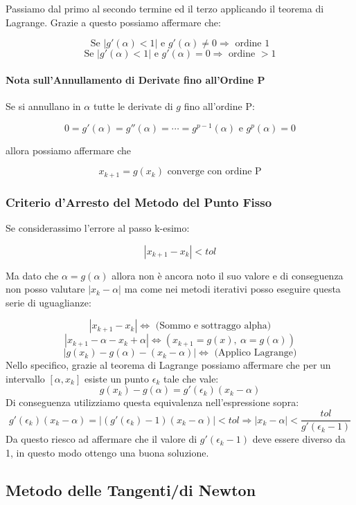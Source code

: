 \documentclass{article}
\begin{document}
Passiamo dal primo al secondo termine ed il terzo applicando il teorema di Lagrange. Grazie a questo possiamo affermare che:

\[ \text{Se } |g'(\alpha) < 1| \text{ e } g'(\alpha) \neq 0 \Rightarrow \text{ ordine 1} \]
\[ \text{Se } |g'(\alpha) < 1| \text{ e } g'(\alpha) = 0 \Rightarrow \text{ ordine } > 1 \]

\paragraph{Nota sull'Annullamento di Derivate fino all'Ordine P} Se si annullano in $\alpha$ tutte le derivate di $g$ fino all'ordine P:

\[ 0 = g'(\alpha) = g''(\alpha) = \cdots = g^{p-1}(\alpha) \text{ e } g^{p}(\alpha) = 0 \]

allora possiamo affermare che

\[ x_{k+1} = g(x_{k}) \text{ converge con ordine P} \]

\subsubsection{Criterio d'Arresto del Metodo del Punto Fisso}

Se considerassimo l'errore al passo k-esimo:

\[ |x_{k+1} - x_{k}| < tol \]

Ma dato che $\alpha = g(\alpha)$ allora non è ancora noto il suo valore e di conseguenza non posso valutare $|x_{k} - \alpha|$ ma come nei metodi iterativi
posso eseguire questa serie di uguaglianze:

\[ |x_{k+1} - x_{k}| \Leftrightarrow \text{ (Sommo e sottraggo alpha)} \]
\[ |x_{k+1} - \alpha - x_{k} + \alpha| \Leftrightarrow (x_{k+1} = g(x), \: \alpha = g(\alpha)) \]
\[ |g(x_{k}) - g(\alpha) - (x_{k} - \alpha ) | \Leftrightarrow \text{ (Applico Lagrange)} \]
\newpage
Nello specifico, grazie al teorema di Lagrange possiamo affermare che per un intervallo $[\alpha, x_{k}]$ esiste un punto $\epsilon_{k}$ tale che vale:
\[ g(x_{k}) - g(\alpha) = g'(\epsilon_{k})(x_{k} - \alpha ) \]
Di conseguenza utilizziamo questa equivalenza nell'espressione sopra:
\[ g'(\epsilon_{k})(x_{k} - \alpha ) = |(g'(\epsilon_{k}) - 1)(x_{k} - \alpha)| < tol \Rightarrow |x_{k} - \alpha| < \frac{tol}{g'(\epsilon_{k}-1)} \]
Da questo riesco ad affermare che il valore di $g'(\epsilon_{k}-1)$ deve essere diverso da 1, in questo modo ottengo una buona soluzione.

\subsection{Metodo delle Tangenti/di Newton}
\end{document}
